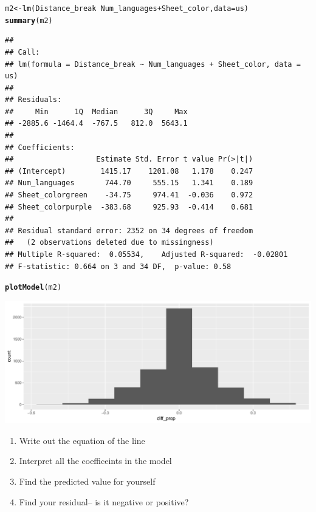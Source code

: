 \documentclass[10pt]{article}\usepackage[]{graphicx}\usepackage[]{color}
\makeatletter
\def\maxwidth{ %
  \ifdim\Gin@nat@width>\linewidth
    \linewidth
  \else
    \Gin@nat@width
  \fi
}
\newcommand{\hlopt}[1]{\textcolor[rgb]{0,0,0}{#1}}%
\newcommand{\hlstd}[1]{\textcolor[rgb]{0.345,0.345,0.345}{#1}}%
\newcommand{\hlkwb}[1]{\textcolor[rgb]{0.69,0.353,0.396}{#1}}%
\newcommand{\hlkwc}[1]{\textcolor[rgb]{0.333,0.667,0.333}{#1}}%
\newcommand{\hlkwd}[1]{\textcolor[rgb]{0.737,0.353,0.396}{\textbf{#1}}}%
\newenvironment{kframe}{%
 \def\at@end@of@kframe{}%
 \ifinner\ifhmode%
  \def\at@end@of@kframe{\end{minipage}}%
  \begin{minipage}{\columnwidth}%
 \fi\fi%
 \def\FrameCommand##1{\hskip\@totalleftmargin \hskip-\fboxsep
 \colorbox{shadecolor}{##1}\hskip-\fboxsep
     \hskip-\linewidth \hskip-\@totalleftmargin \hskip\columnwidth}%
 \MakeFramed {\advance\hsize-\width
   \@totalleftmargin\z@ \linewidth\hsize
   \@setminipage}}%
 {\par\unskip\endMakeFramed%
 \at@end@of@kframe}
\newenvironment{knitrout}{}{} %
\makeatother
\begin{document}
\begin{knitrout}\footnotesize
{}\color{fgcolor}\begin{kframe}
\begin{alltt}
\hlstd{m2} \hlkwb{<-} \hlkwd{lm}\hlstd{(Distance_break}\hlopt{~}\hlstd{Num_languages}\hlopt{+}\hlstd{Sheet_color,} \hlkwc{data}\hlstd{=us)}
\hlkwd{summary}\hlstd{(m2)}
\end{alltt}
\begin{verbatim}
## 
## Call:
## lm(formula = Distance_break ~ Num_languages + Sheet_color, data = us)
## 
## Residuals:
##     Min      1Q  Median      3Q     Max 
## -2885.6 -1464.4  -767.5   812.0  5643.1 
## 
## Coefficients:
##                   Estimate Std. Error t value Pr(>|t|)
## (Intercept)        1415.17    1201.08   1.178    0.247
## Num_languages       744.70     555.15   1.341    0.189
## Sheet_colorgreen    -34.75     974.41  -0.036    0.972
## Sheet_colorpurple  -383.68     925.93  -0.414    0.681
## 
## Residual standard error: 2352 on 34 degrees of freedom
##   (2 observations deleted due to missingness)
## Multiple R-squared:  0.05534,	Adjusted R-squared:  -0.02801 
## F-statistic: 0.664 on 3 and 34 DF,  p-value: 0.58
\end{verbatim}
\begin{alltt}
\hlkwd{plotModel}\hlstd{(m2)}
\end{alltt}
\end{kframe}
\includegraphics[width=\maxwidth]{figure/unnamed-chunk-3-1} 

\end{knitrout}
\clearpage
\begin{enumerate}
\itemsep1.2in
\item Write out the equation of the line
\item Interpret all the coefficeints in the model
\item Find the predicted value for yourself
\item Find your residual-- is it negative or positive?
 \vspace{1in}
\end{enumerate}
\end{document}

